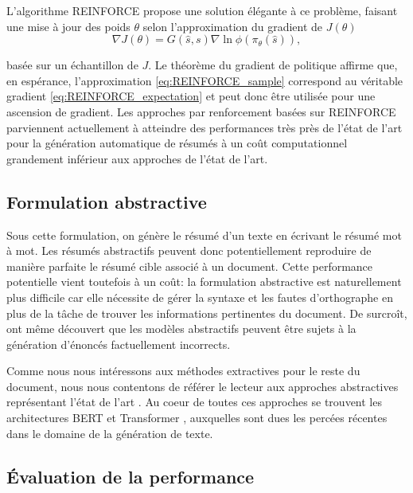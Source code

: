 L'algorithme REINFORCE \citep{williams1992simple} propose une
solution élégante à ce problème, faisant une mise à jour des poids $\theta$ selon l'approximation du gradient
de $J(\theta)$
\begin{equation}
    \nabla J(\theta) = G(\hat{s}, s)\nabla \ln \phi\left(\pi_\theta (\hat{s})\right),
    \label{eq:REINFORCE_sample}
\end{equation}

basée sur un échantillon de $J$.
Le théorème du gradient de politique \citep{sutton1999policy} affirme que, en espérance,
l'approximation \ref{eq:REINFORCE_sample} correspond au véritable gradient \ref{eq:REINFORCE_expectation}
et peut donc être utilisée pour une ascension de gradient.
Les approches par renforcement basées sur REINFORCE \citep{dong2018banditsum,luo-etal-2019-reading}
parviennent actuellement à atteindre des performances très près de l'état
de l'art pour la génération automatique de résumés à un coût computationnel 
grandement inférieur aux approches de l'état de l'art.

\subsection{Formulation abstractive}

Sous cette formulation, on génère le résumé d'un texte en écrivant 
le résumé mot à mot.
Les résumés abstractifs peuvent donc potentiellement reproduire 
de manière parfaite le résumé cible associé à un document.
Cette performance potentielle vient toutefois à un coût:
la formulation abstractive est naturellement plus difficile car elle nécessite de
gérer la syntaxe et les fautes d'orthographe en plus de la tâche 
de trouver les informations pertinentes du document.
De surcroît, \citet{kryscinski2020evaluating} ont même 
découvert que les modèles abstractifs peuvent être sujets à la génération 
d'énoncés factuellement incorrects.

Comme nous nous intéressons aux méthodes extractives pour le reste du document,
nous nous contentons de référer le lecteur aux approches abstractives
représentant l'état de l'art \citep{dou2020gsum, 2020t5, unilm, zhang2019pegasus}.
Au coeur de toutes ces approches se trouvent les architectures BERT 
\citep{devlin-etal-2019-bert} et Transformer \citep{vaswani2017attention},
auxquelles sont dues les percées récentes dans le domaine de la génération 
de texte.

\subsection{Évaluation de la performance}
\label{sec:rouge}

